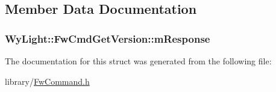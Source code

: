 \subsection{Member Data Documentation}
\hypertarget{struct_wy_light_1_1_fw_cmd_get_version_aba05bc2fdb7c1aa0eb8093dc8fbe8879}{
\subsubsection[{m\-Response}]{ Wy\-Light\-::\-Fw\-Cmd\-Get\-Version\-::m\-Response}}\label{struct_wy_light_1_1_fw_cmd_get_version_aba05bc2fdb7c1aa0eb8093dc8fbe8879}


The documentation for this struct was generated from the following file\-:\begin{DoxyCompactItemize}
\item 
library/\hyperlink{_fw_command_8h}{Fw\-Command.\-h}\end{DoxyCompactItemize}
